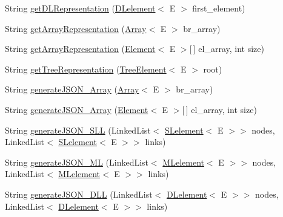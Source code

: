 \begin{DoxyCompactItemize}
\item 
String \hyperlink{classbridges_1_1base_1_1_a_d_t_visualizer_a43eeb9f3321477f58edc3aff52631f3b}{get\+D\+L\+Representation} (\hyperlink{classbridges_1_1base_1_1_d_lelement}{D\+Lelement}$<$ E $>$ first\+\_\+element)
\item 
String \hyperlink{classbridges_1_1base_1_1_a_d_t_visualizer_ab3e96c568b11f9ef683191d1e03d5719}{get\+Array\+Representation} (\hyperlink{classbridges_1_1base_1_1_array}{Array}$<$ E $>$ br\+\_\+array)
\item 
String \hyperlink{classbridges_1_1base_1_1_a_d_t_visualizer_ad44bb58d6f9c630cc6bbcae175003243}{get\+Array\+Representation} (\hyperlink{classbridges_1_1base_1_1_element}{Element}$<$ E $>$\mbox{[}$\,$\mbox{]} el\+\_\+array, int size)
\item 
String \hyperlink{classbridges_1_1base_1_1_a_d_t_visualizer_ae01d3d38d5c7c3ac239e86d6be46a50a}{get\+Tree\+Representation} (\hyperlink{classbridges_1_1base_1_1_tree_element}{Tree\+Element}$<$ E $>$ root)
\item 
String \hyperlink{classbridges_1_1base_1_1_a_d_t_visualizer_a1f37c20302432878a91c03544b81cc27}{generate\+J\+S\+O\+N\+\_\+\+Array} (\hyperlink{classbridges_1_1base_1_1_array}{Array}$<$ E $>$ br\+\_\+array)
\item 
String \hyperlink{classbridges_1_1base_1_1_a_d_t_visualizer_a309d4f0521b66bb1329c0362f1ca5d33}{generate\+J\+S\+O\+N\+\_\+\+Array} (\hyperlink{classbridges_1_1base_1_1_element}{Element}$<$ E $>$\mbox{[}$\,$\mbox{]} el\+\_\+array, int size)
\item 
String \hyperlink{classbridges_1_1base_1_1_a_d_t_visualizer_adf2164b7f4b3befb8b2cb2904efd8c91}{generate\+J\+S\+O\+N\+\_\+\+S\+LL} (Linked\+List$<$ \hyperlink{classbridges_1_1base_1_1_s_lelement}{S\+Lelement}$<$ E $>$$>$ nodes, Linked\+List$<$ \hyperlink{classbridges_1_1base_1_1_s_lelement}{S\+Lelement}$<$ E $>$$>$ links)
\item 
String \hyperlink{classbridges_1_1base_1_1_a_d_t_visualizer_a5c65bf6d0132b8cab58dd1038e48fa79}{generate\+J\+S\+O\+N\+\_\+\+ML} (Linked\+List$<$ \hyperlink{classbridges_1_1base_1_1_m_lelement}{M\+Lelement}$<$ E $>$$>$ nodes, Linked\+List$<$ \hyperlink{classbridges_1_1base_1_1_m_lelement}{M\+Lelement}$<$ E $>$$>$ links)
\item 
String \hyperlink{classbridges_1_1base_1_1_a_d_t_visualizer_a866df531965d152d5686304f07e15a4a}{generate\+J\+S\+O\+N\+\_\+\+D\+LL} (Linked\+List$<$ \hyperlink{classbridges_1_1base_1_1_d_lelement}{D\+Lelement}$<$ E $>$$>$ nodes, Linked\+List$<$ \hyperlink{classbridges_1_1base_1_1_d_lelement}{D\+Lelement}$<$ E $>$$>$ links)

\end{DoxyCompactItemize}
